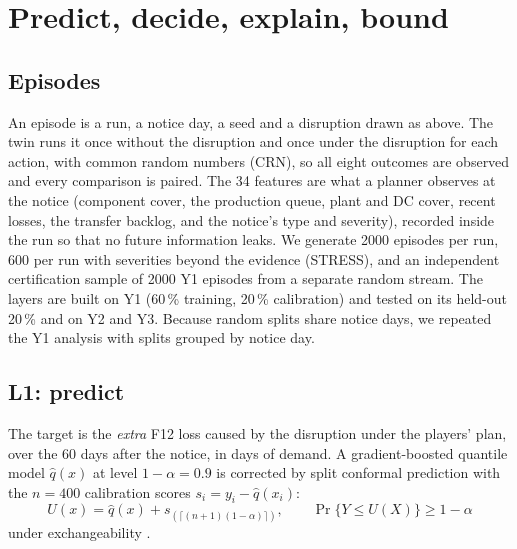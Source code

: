 \documentclass{ifacconf}
\begin{document}
\section{Predict, decide, explain, bound}

\subsection{Episodes}
An episode is a run, a notice day, a seed and a disruption drawn as above. The twin runs it once without the
disruption and once under the disruption for each action, with common random numbers (CRN), so all eight
outcomes are observed and every comparison is paired. The 34 features are what a planner observes at the notice
(component cover, the production queue, plant and DC cover, recent losses, the transfer backlog, and the notice's
type and severity), recorded inside the run so that no future information leaks. We generate \num{2000}
episodes per run, 600 per run with severities beyond the evidence (STRESS), and an independent certification
sample of \num{2000} Y1 episodes from a separate random stream. The layers are built on Y1 (60\,\% training,
20\,\% calibration) and tested on its held-out 20\,\% and on Y2 and Y3. Because random splits share notice days,
we repeated the Y1 analysis with splits grouped by notice day.

\subsection{L1: predict}
The target is the \emph{extra} F12 loss caused by the disruption under the players' plan, over the 60 days after
the notice, in days of demand. A gradient-boosted \citep{ke2017lightgbm} quantile model $\hat q(x)$ at level
$1-\alpha=0.9$ is corrected by split conformal prediction with the $n=400$ calibration scores
$s_i = y_i - \hat q(x_i)$:
\begin{equation}
U(x) = \hat q(x) + s_{(\lceil (n+1)(1-\alpha)\rceil)}, \qquad \Pr\{Y \le U(X)\} \ge 1-\alpha
\end{equation}
under exchangeability \citep{romano2019cqr,angelopoulos2023gentle}.
\end{document}
